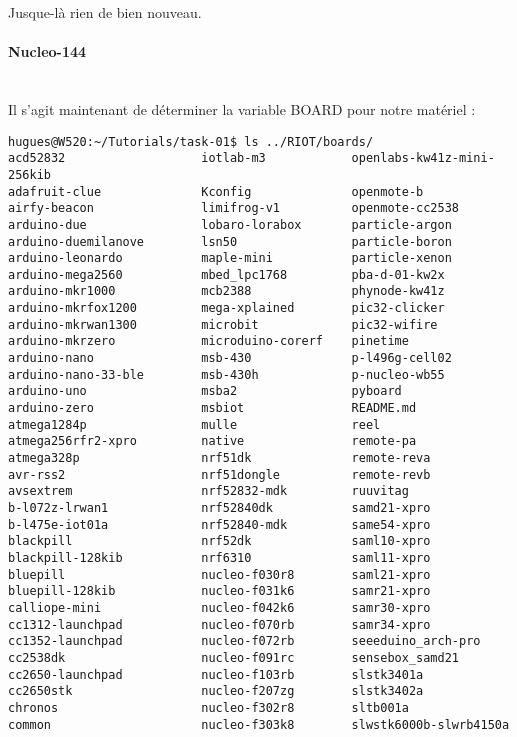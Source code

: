 Jusque-là rien de bien nouveau.

\paragraph{Nucleo-144}~\\

Il s'agit maintenant de déterminer la variable BOARD
pour notre matériel :
{\footnotesize
\begin{verbatim}
hugues@W520:~/Tutorials/task-01$ ls ../RIOT/boards/
acd52832                   iotlab-m3            openlabs-kw41z-mini-256kib
adafruit-clue              Kconfig              openmote-b
airfy-beacon               limifrog-v1          openmote-cc2538
arduino-due                lobaro-lorabox       particle-argon
arduino-duemilanove        lsn50                particle-boron
arduino-leonardo           maple-mini           particle-xenon
arduino-mega2560           mbed_lpc1768         pba-d-01-kw2x
arduino-mkr1000            mcb2388              phynode-kw41z
arduino-mkrfox1200         mega-xplained        pic32-clicker
arduino-mkrwan1300         microbit             pic32-wifire
arduino-mkrzero            microduino-corerf    pinetime
arduino-nano               msb-430              p-l496g-cell02
arduino-nano-33-ble        msb-430h             p-nucleo-wb55
arduino-uno                msba2                pyboard
arduino-zero               msbiot               README.md
atmega1284p                mulle                reel
atmega256rfr2-xpro         native               remote-pa
atmega328p                 nrf51dk              remote-reva
avr-rss2                   nrf51dongle          remote-revb
avsextrem                  nrf52832-mdk         ruuvitag
b-l072z-lrwan1             nrf52840dk           samd21-xpro
b-l475e-iot01a             nrf52840-mdk         same54-xpro
blackpill                  nrf52dk              saml10-xpro
blackpill-128kib           nrf6310              saml11-xpro
bluepill                   nucleo-f030r8        saml21-xpro
bluepill-128kib            nucleo-f031k6        samr21-xpro
calliope-mini              nucleo-f042k6        samr30-xpro
cc1312-launchpad           nucleo-f070rb        samr34-xpro
cc1352-launchpad           nucleo-f072rb        seeeduino_arch-pro
cc2538dk                   nucleo-f091rc        sensebox_samd21
cc2650-launchpad           nucleo-f103rb        slstk3401a
cc2650stk                  nucleo-f207zg        slstk3402a
chronos                    nucleo-f302r8        sltb001a
common                     nucleo-f303k8        slwstk6000b-slwrb4150a

\end{verbatim}}

